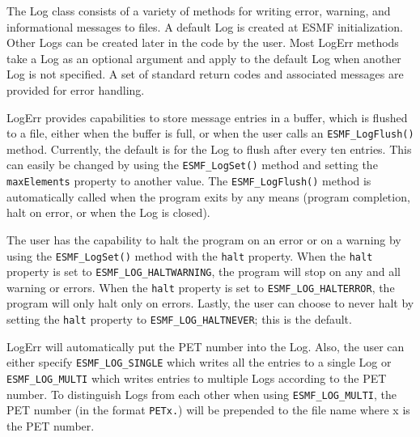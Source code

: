 



The Log class consists of a variety of methods for writing error, warning, and
informational messages to files.  A default Log is created at ESMF
initialization.  Other Logs can be created later in the code by the user.  Most
LogErr methods take a Log as an optional argument and apply to the default Log
when another Log is not specified.  A set of standard return codes and
associated messages are provided for error handling.  

LogErr provides capabilities to store message entries in a buffer, which is 
flushed to a file, either when the buffer is full, or when the user calls an 
{\tt ESMF\_LogFlush()} method.  Currently, the default is for the Log to flush
after every ten entries.  This can easily be changed by using the 
{\tt ESMF\_LogSet()} method and setting the {\tt maxElements} property to 
another value.  The {\tt ESMF\_LogFlush()} method is automatically called when 
the program exits by any means (program completion, halt on error, or when the
Log is closed).

The user has the capability to halt the program on an error or on a warning by
using the {\tt ESMF\_LogSet()} method with the {\tt halt} property.  When the 
{\tt halt} property is set to {\tt ESMF\_LOG\_HALTWARNING}, the program will 
stop on any and all warning or errors.  When the {\tt halt} property is set to 
{\tt ESMF\_LOG\_HALTERROR}, the program will only halt only on errors.  Lastly,
the user can choose to never halt by setting the {\tt halt} property to 
{\tt ESMF\_LOG\_HALTNEVER}; this is the default.

LogErr will automatically put the PET number into the Log.  Also, the user can 
either specify {\tt ESMF\_LOG\_SINGLE} which writes all the entries to a single 
Log or {\tt ESMF\_LOG\_MULTI} which writes entries to multiple Logs according to 
the PET number.  To distinguish Logs from each other when using 
{\tt ESMF\_LOG\_MULTI}, the PET number (in the format {\tt PETx.}) will be 
prepended to the file name where x is the PET number.

